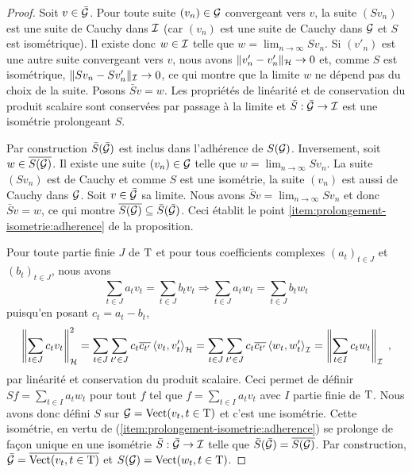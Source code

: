\begin{proof}
  Soit $v \in \bar{\mathcal{G}}$. Pour toute suite $(v_n) \in \mathcal{G}$ convergeant vers
  $v$, la suite $(Sv_n)$ est une suite de Cauchy dans $\mathcal{I}$ (car $(v_n)$ est
  une suite de Cauchy dans $\mathcal{G}$ et $S$ est isom\'{e}trique). Il existe donc $w
  \in \mathcal{I}$ telle que $w = \lim_{n \to \infty} Sv_n$. Si $(v'_n)$ est une
  autre suite convergeant vers $v$, nous avons $\|v'_n - v'_n\|_{\mathcal{H}} \to 0$
  et, comme $S$ est isom\'{e}trique, $\|Sv_n - Sv'_n\|_{\mathcal{I}} \to 0$, ce qui montre
  que la limite $w$ ne d\'{e}pend pas du choix de la suite. Posons $\bar{S}v=
  w$. Les propri\'{e}t\'{e}s de lin\'{e}arit\'{e} et de conservation du produit scalaire sont
  conserv\'{e}es par passage \`{a} la limite et $\bar{S}: \bar{\mathcal{G}} \to \mathcal{I}$ est
  une isom\'{e}trie prolongeant $S$.

Par construction $\bar{S}(\bar{\mathcal{G}})$ est inclus dans l'adh\'{e}rence de $S(\mathcal{G})$. Inversement, soit $w \in \overline{S(\mathcal{G})}$.
Il existe une suite $(v_n) \in \mathcal{G}$ telle que $w= \lim_{n \to \infty} Sv_n$. La suite $(Sv_n)$ est de Cauchy et comme $S$ est une isom\'{e}trie, la suite $(v_n)$ est aussi de Cauchy dans $\mathcal{G}$. Soit $v \in \bar{\mathcal{G}}$ sa limite. Nous avons $\bar{S}v= \lim_{n \to \infty} S v_n$ et donc $\bar{S}v= w$, ce qui montre $\overline{S(\mathcal{G})} \subseteq \bar{S}(\bar{\mathcal{G}})$. Ceci \'{e}tablit le point \eqref{item:prolongement-isometrie:adherence} de la proposition.

Pour toute partie finie $J$ de
$\mathrm{T}$ et pour tous coefficients complexes $(a_t)_{t \in J}$ et $(b_t)_{t \in
  J}$, nous avons
$$
\sum_{t \in J} a_t v_t=\sum_{t \in J} b_t v_t \Rightarrow
\sum_{t \in J} a_t w_t=\sum_{t \in J} b_t w_t
$$
puisqu'en posant $c_t=a_t-b_t$,
\begin{equation*}
\left\| \sum_{t \in J} c_t v_t \right\|_{\mathcal{H}}^2 =
\sum_{t \in J} \sum_{t' \in J} c_{t} \overline{c_{t'}}
\left\langle v_t, v_t' \right\rangle_{\mathcal{H}}=
 \sum_{t \in J} \sum_{t' \in J} c_{t} \overline{c_{t'}}
 \left\langle w_t, w_t' \right\rangle_{\mathcal{I}}
=\left\| \sum_{t \in I} c_t w_t \right\|_{\mathcal{I}} \;,
\end{equation*}
par lin\'{e}arit\'{e} et conservation du produit scalaire.  Ceci permet de d\'{e}finir $Sf=
\sum_{t \in I} a_t w_t$ pour tout $f$ tel que $f = \sum_{t \in I} a_t
v_t$ avec $I$ partie finie de $\mathrm{T}$. Nous avons donc d\'{e}fini $S$ sur
$\mathcal{G}=\mathrm{Vect}(v_t, t \in \mathrm{T})$ et c'est une isom\'{e}trie. Cette isom\'{e}trie, en
vertu de (\ref{item:prolongement-isometrie:adherence}) se prolonge de fa\c{c}on
unique en une isom\'{e}trie $\bar{S}: \bar{\mathcal{G}} \to \mathcal{I}$ telle que
$\bar{S}(\bar{\mathcal{G}})= \overline{S(\mathcal{G})}$.  Par construction, $\bar{\mathcal{G}}=
\overline{\mathrm{Vect}(v_t, t \in \mathrm{T})}$ et $S(\mathcal{G}) = \mathrm{Vect}(w_t, t \in \mathrm{T})$.

\end{proof}





